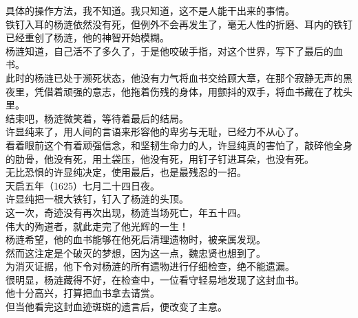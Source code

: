 \begin{multicols}{\theparacolNo}
具体的操作方法，我不知道。我只知道，这不是人能干出来的事情。\\

铁钉入耳的杨涟依然没有死，但例外不会再发生了，毫无人性的折磨、耳内的铁钉已经重创了杨涟，他的神智开始模糊。\\

杨涟知道，自己活不了多久了，于是他咬破手指，对这个世界，写下了最后的血书。\\

此时的杨涟已处于濒死状态，他没有力气将血书交给顾大章，在那个寂静无声的黑夜里，凭借着顽强的意志，他拖着伤残的身体，用颤抖的双手，将血书藏在了枕头里。\\

结束吧，杨涟微笑着，等待着最后的结局。\\

许显纯来了，用人间的言语来形容他的卑劣与无耻，已经力不从心了。\\

看着眼前这个有着顽强信念，和坚韧生命力的人，许显纯真的害怕了，敲碎他全身的肋骨，他没有死，用土袋压，他没有死，用钉子钉进耳朵，也没有死。\\

无比恐惧的许显纯决定，使用最后，也是最残忍的一招。\\

天启五年（1625）七月二十四日夜。\\

许显纯把一根大铁钉，钉入了杨涟的头顶。\\

这一次，奇迹没有再次出现，杨涟当场死亡，年五十四。\\

伟大的殉道者，就此走完了他光辉的一生！\\

杨涟希望，他的血书能够在他死后清理遗物时，被亲属发现。\\

然而这注定是个破灭的梦想，因为这一点，魏忠贤也想到了。\\

为消灭证据，他下令对杨涟的所有遗物进行仔细检查，绝不能遗漏。\\

很明显，杨涟藏得不好，在检查中，一位看守轻易地发现了这封血书。\\

他十分高兴，打算把血书拿去请赏。\\

但当他看完这封血迹斑斑的遗言后，便改变了主意。\\


\end{multicols}
